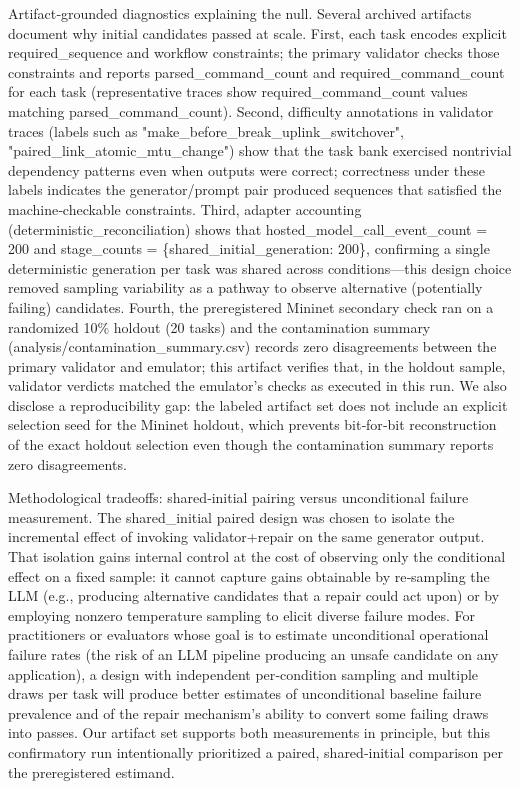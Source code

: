 \documentclass[conference]{IEEEtran}
\begin{document}
Artifact‑grounded diagnostics explaining the null. Several archived artifacts document why initial candidates passed at scale. First, each task encodes explicit required\_sequence and workflow constraints; the primary validator checks those constraints and reports parsed\_command\_count and required\_command\_count for each task (representative traces show required\_command\_count values matching parsed\_command\_count). Second, difficulty annotations in validator traces (labels such as "make\_before\_break\_uplink\_switchover", "paired\_link\_atomic\_mtu\_change") show that the task bank exercised nontrivial dependency patterns even when outputs were correct; correctness under these labels indicates the generator/prompt pair produced sequences that satisfied the machine‑checkable constraints. Third, adapter accounting (deterministic\_reconciliation) shows that hosted\_model\_call\_event\_count = 200 and stage\_counts = \{shared\_initial\_generation: 200\}, confirming a single deterministic generation per task was shared across conditions---this design choice removed sampling variability as a pathway to observe alternative (potentially failing) candidates. Fourth, the preregistered Mininet secondary check ran on a randomized 10\% holdout (20 tasks) and the contamination summary (analysis/contamination\_summary.csv) records zero disagreements between the primary validator and emulator; this artifact verifies that, in the holdout sample, validator verdicts matched the emulator's checks as executed in this run. We also disclose a reproducibility gap: the labeled artifact set does not include an explicit selection seed for the Mininet holdout, which prevents bit‑for‑bit reconstruction of the exact holdout selection even though the contamination summary reports zero disagreements.

Methodological tradeoffs: shared‑initial pairing versus unconditional failure measurement. The shared\_initial paired design was chosen to isolate the incremental effect of invoking validator+repair on the same generator output. That isolation gains internal control at the cost of observing only the conditional effect on a fixed sample: it cannot capture gains obtainable by re‑sampling the LLM (e.g., producing alternative candidates that a repair could act upon) or by employing nonzero temperature sampling to elicit diverse failure modes. For practitioners or evaluators whose goal is to estimate unconditional operational failure rates (the risk of an LLM pipeline producing an unsafe candidate on any application), a design with independent per‑condition sampling and multiple draws per task will produce better estimates of unconditional baseline failure prevalence and of the repair mechanism's ability to convert some failing draws into passes. Our artifact set supports both measurements in principle, but this confirmatory run intentionally prioritized a paired, shared‑initial comparison per the preregistered estimand.
\end{document}
